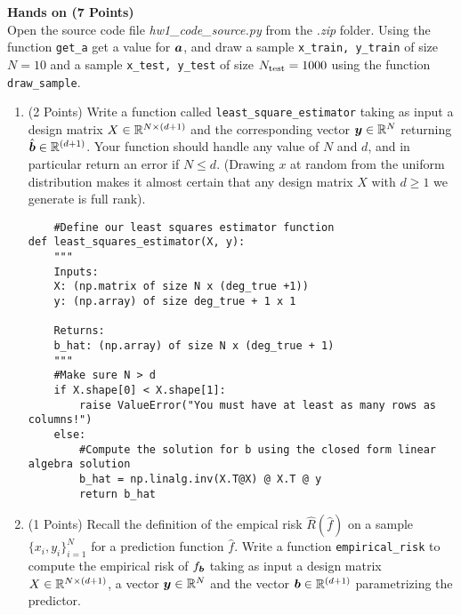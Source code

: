 \documentclass{article}
\newcommand{\bb}{b}
\begin{document}
\textbf{\color{nyupurple} Hands on (7 Points)}\\
Open the source code file \emph{hw1\_code\_source.py} from the \emph{.zip} folder. Using the function \texttt{get\_a}  get a value for $\boldsymbol{a}$, and draw a sample \texttt{x\_train, y\_train} of size $N=10$ and a sample \texttt{x\_test, y\_test} of size $N_{\rm test}=1000$ using the function \texttt{draw\_sample}.

\begin{enumerate}
\setcounter{enumi}{\value{saveenum}}
    \item (2 Points) Write a function called \texttt{least\_square\_estimator} taking as input a design matrix $X \in {\mathbb{R}}^{N \times (d + 1)}$ and the corresponding vector  $\boldsymbol{y} \in {\mathbb{R}}^N$ returning $\hat{\boldsymbol{b}} \in {\mathbb{R}}^{(d + 1)}$. Your function should handle any value of $N$ and $d$, and in particular return an error if $N \leq d$. (Drawing $x$ at random from the uniform distribution makes it almost certain that any design matrix $X$ with $d \geq 1$ we generate is full rank).
    \subitem
    \begin{verbatim}
    #Define our least squares estimator function
def least_squares_estimator(X, y):
    """
    Inputs:
    X: (np.matrix of size N x (deg_true +1))
    y: (np.array) of size deg_true + 1 x 1
    
    Returns:
    b_hat: (np.array) of size N x (deg_true + 1)
    """
    #Make sure N > d
    if X.shape[0] < X.shape[1]:
        raise ValueError("You must have at least as many rows as columns!")
    else:
        #Compute the solution for b using the closed form linear algebra solution
        b_hat = np.linalg.inv(X.T@X) @ X.T @ y
        return b_hat
\end{verbatim}
    \item (1 Points) Recall the definition of the empical risk $\hat{R}(\hat{f})$ on a sample $\{x_i, y_i\}_{i=1}^N$ for a prediction function $\hat{f}$. Write a function \texttt{empirical\_risk} to compute the empirical risk of $f_{\bs \bb}$ taking as input a design matrix $X \in {\mathbb{R}}^{N \times (d + 1)}$, a vector $\boldsymbol{y} \in {\mathbb{R}}^N$ and the vector  $\bs \bb \in \sR^{(d+1)}$ parametrizing the predictor.
    \subitem
    

\end{enumerate}
\end{document}
